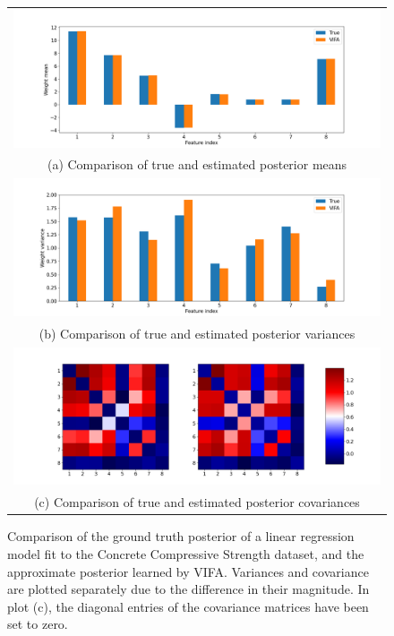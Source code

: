 \documentclass[msc,deptreport.inf]{infthesis} %
\begin{document}
\begin{figure}[!htbp] 
	\begin{tabular}{c}
		\includegraphics[width=140mm]{plots/concrete_strength_posterior_mean.png} \\
		(a) Comparison of true and estimated posterior means \\[6pt] 
		 \includegraphics[width=140mm]{plots/concrete_strength_posterior_variance.png} \\
		(b) Comparison of true and estimated posterior variances \\[6pt] 
		\includegraphics[width=140mm]{plots/concrete_strength_posterior_covariance.png} \\
		(c) Comparison of true and estimated posterior covariances \\[6pt] 
	\end{tabular}
	\caption{Comparison of the ground truth posterior of a linear regression model fit to the Concrete Compressive Strength dataset, and the approximate posterior learned by VIFA. Variances and covariance are plotted separately due to the difference in their magnitude. In plot (c), the diagonal entries of the covariance matrices have been set to zero.}
	\label{fig:posterior_concrete_strength}
\end{figure} 
\end{document}
